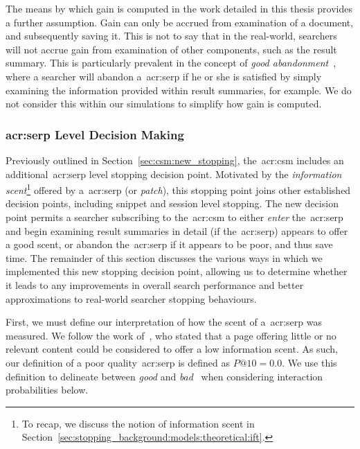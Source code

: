The means by which gain is computed in the work detailed in this thesis provides a further assumption. Gain can only be accrued from examination of a document, and subsequently saving it. This is not to say that in the real-world, searchers will not accrue gain from examination of other components, such as the result summary. This is particularly prevalent in the concept of \emph{good abandonment}~\citep{li2009good_abandonment}, where a searcher will abandon a~\gls{acr:serp} if he or she is satisfied by simply examining the information provided within result summaries, for example. We do not consider this within our simulations to simplify how gain is computed.

\subsubsection{\gls{acr:serp} Level Decision Making}\label{chap:csm:method:simulation:grounding:serp}
Previously outlined in Section~\ref{sec:csm:new_stopping}, the~\gls{acr:csm} includes an additional~\gls{acr:serp} level stopping decision point. Motivated by the \emph{information scent}\footnote{To recap, we discuss the notion of information scent in Section~\ref{sec:stopping_background:models:theoretical:ift}.} offered by a~\gls{acr:serp} (or \emph{patch}), this stopping point joins other established decision points, including snippet and session level stopping. The new decision point permits a searcher subscribing to the~\gls{acr:csm} to either \emph{enter} the~\gls{acr:serp} and begin examining result summaries in detail (if the~\gls{acr:serp}) appears to offer a good scent, or abandon the~\gls{acr:serp} if it appears to be poor, and thus save time. The remainder of this section discusses the various ways in which we implemented this new stopping decision point, allowing us to determine whether it leads to any improvements in overall search performance and better approximations to real-world searcher stopping behaviours.

 First, we must define our interpretation of how the scent of a~\gls{acr:serp} was measured. We follow the work of~\cite{wu2014information_scent}, who stated that a page offering little or no relevant content could be considered to offer a low information scent. As such, our definition of a poor quality~\gls{acr:serp} is defined as $P@10=0.0$. We use this definition to delineate between \emph{good} and \emph{bad}~ when considering interaction probabilities below.

